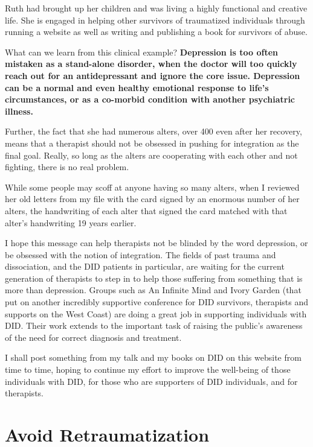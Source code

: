 \documentclass[]{book}
\begin{document}
Ruth had brought up her children and was living a highly functional and creative life. She is engaged in helping other survivors of traumatized individuals through running a website as well as writing and publishing a book for survivors of abuse.

What can we learn from this clinical example? \textbf{Depression is too often mistaken as a stand-alone disorder, when the doctor will too quickly reach out for an antidepressant and ignore the core issue. Depression can be a normal and even healthy emotional response to life's circumstances, or as a co-morbid condition with another psychiatric illness.}

Further, the fact that she had numerous alters, over 400 even after her recovery, means that a therapist should not be obsessed in pushing for integration as the final goal. Really, so long as the alters are cooperating with each other and not fighting, there is no real problem.

While some people may scoff at anyone having so many alters, when I reviewed her old letters from my file with the card signed by an enormous number of her alters, the handwriting of each alter that signed the card matched with that alter's handwriting 19 years earlier.

I hope this message can help therapists not be blinded by the word depression, or be obsessed with the notion of integration. The fields of past trauma and dissociation, and the DID patients in particular, are waiting for the current generation of therapists to step in to help those suffering from something that is more than depression. Groups such as An Infinite Mind and Ivory Garden (that put on another incredibly supportive conference for DID survivors, therapists and supports on the West Coast) are doing a great job in supporting individuals with DID. Their work extends to the important task of raising the public's awareness of the need for correct diagnosis and treatment.

I shall post something from my talk and my books on DID on this website from time to time, hoping to continue my effort to improve the well-being of those individuals with DID, for those who are supporters of DID individuals, and for therapists.

\hypertarget{avoid-retraumatization}{%
\section{Avoid Retraumatization}\label{avoid-retraumatization}}
\end{document}
